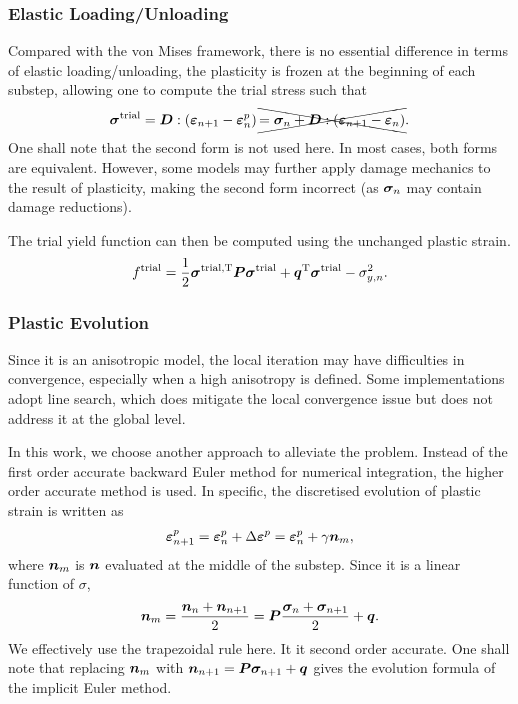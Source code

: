 \subsubsection{Elastic Loading/Unloading}
Compared with the von Mises framework, there is no essential difference in terms of elastic loading/unloading, the plasticity is frozen at the beginning of each substep, allowing one to compute the trial stress such that
\begin{gather}
\bm{\sigma}^\text{trial}=\bm{D}:\left(\bm{\varepsilon}_{n+1}-\bm{\varepsilon}^p_n\right)\xcancel{=\bm{\sigma}_n+\bm{D}:\left(\bm{\varepsilon}_{n+1}-\bm{\varepsilon}_n\right)}.
\end{gather}
One shall note that the second form is not used here. In most cases, both forms are equivalent. However, some models may further apply damage mechanics to the result of plasticity, making the second form incorrect (as $\bm{\sigma}_n$ may contain damage reductions).

The trial yield function can then be computed using the unchanged plastic strain.
\begin{gather}
f^\text{trial}=\dfrac{1}{2}\bm{\sigma}^\text{trial,T}\bm{P}\bm{\sigma}^\text{trial}+\bm{q}^{\mathrm{T}}\bm{\sigma}^\text{trial}-\sigma_{y,n}^2.
\end{gather}
\subsubsection{Plastic Evolution}
Since it is an anisotropic model, the local iteration may have difficulties in convergence, especially when a high anisotropy is defined. Some implementations \cite{Krasnovskiy2004,SouzaNeto2008} adopt line search, which does mitigate the local convergence issue but does not address it at the global level.

In this work, we choose another approach to alleviate the problem. Instead of the first order accurate backward Euler method for numerical integration, the higher order accurate method is used. In specific, the discretised evolution of plastic strain is written as
\begin{gather}
\bm{\varepsilon}^p_{n+1}=\bm{\varepsilon}^p_{n}+\Delta\bm{\varepsilon}^p=\bm{\varepsilon}^p_{n}+\gamma\bm{n}_{m},
\end{gather}
where $\bm{n}_{m}$ is $\bm{n}$ evaluated at the middle of the substep. Since it is a linear function of $\sigma$,
\begin{gather}
\bm{n}_m=\dfrac{\bm{n}_n+\bm{n}_{n+1}}{2}=\bm{P}\dfrac{\bm{\sigma}_n+\bm{\sigma}_{n+1}}{2}+\bm{q}.
\end{gather}
We effectively use the trapezoidal rule here.
It it second order accurate.
One shall note that replacing $\bm{n}_m$ with $\bm{n}_{n+1}=\bm{P}\bm{\sigma}_{n+1}+\bm{q}$ gives the evolution formula of the implicit Euler method.
